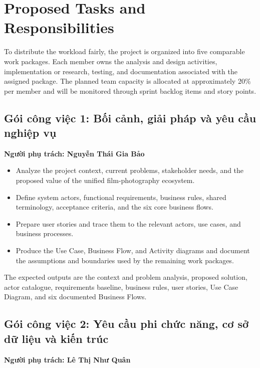 
\section{Proposed Tasks and Responsibilities}


To distribute the workload fairly, the project is organized into five
comparable work packages. Each member owns the analysis and design activities,
implementation or research, testing, and documentation associated with the
assigned package. The planned team capacity is allocated at approximately
20\% per member and will be monitored through sprint backlog items and story
points.

\subsection*{Gói công việc 1: Bối cảnh, giải pháp và yêu cầu nghiệp vụ}

\textbf{Người phụ trách: Nguyễn Thái Gia Bảo}

\begin{itemize}
	\item Analyze the project context, current problems, stakeholder needs, and
	the proposed value of the unified film-photography ecosystem.
	\item Define system actors, functional requirements, business rules, shared
	terminology, acceptance criteria, and the six core business flows.
	\item Prepare user stories and trace them to the relevant actors, use cases,
	and business processes.
	\item Produce the Use Case, Business Flow, and Activity diagrams and document
	the assumptions and boundaries used by the remaining work packages.
\end{itemize}

The expected outputs are the context and problem analysis, proposed solution,
actor catalogue, requirements baseline, business rules, user stories, Use Case
Diagram, and six documented Business Flows.

\subsection*{Gói công việc 2: Yêu cầu phi chức năng, cơ sở dữ liệu và kiến trúc}

\textbf{Người phụ trách: Lê Thị Như Quân}

